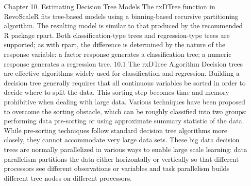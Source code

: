 Chapter 10.
Estimating Decision Tree
Models
The rxDTree function in RevoScaleR fits tree-based models using a binning-based recursive
partitioning algorithm. The resulting model is similar to that produced by the recommended R
package rpart. Both classification-type trees and regression-type trees are supported; as with
rpart, the difference is determined by the nature of the response variable: a factor response
generates a classification tree; a numeric response generates a regression tree.
10.1 The rxDTree Algorithm
Decision trees are effective algorithms widely used for classification and regression. Building a
decision tree generally requires that all continuous variables be sorted in order to decide where
to split the data. This sorting step becomes time and memory prohibitive when dealing with
large data. Various techniques have been proposed to overcome the sorting obstacle, which
can be roughly classified into two groups: performing data pre-sorting or using approximate
summary statistic of the data. While pre-sorting techniques follow standard decision tree
algorithms more closely, they cannot accommodate very large data sets. These big data
decision trees are normally parallelized in various ways to enable large scale learning: data
parallelism partitions the data either horizontally or vertically so that different processors see
different observations or variables and task parallelism builds different tree nodes on different
processors.
